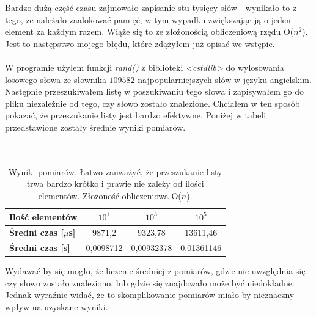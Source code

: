 \documentclass[11pt,a4paper]{article}
\begin{document}
Bardzo dużą część czasu zajmowało zapisanie stu tysięcy słów - wynikało to z tego, że należało zaalokować pamięć, w tym wypadku zwiększając ją o jeden element za każdym razem. Wiąże się to ze złożonością obliczeniową rzędu O($n^2$). Jest to następstwo mojego błędu, które zdążyłem już opisać we wstępie.\\\\
W programie użyłem funkcji \textit{rand()} z biblioteki \textit{<cstdlib>} do wylosowania losowego słowa ze słownika $109582$ najpopularniejszych słów w języku angielskim. Następnie przeszukiwałem listę w poszukiwaniu tego słowa i zapisywałem go do pliku niezależnie od tego, czy słowo zostało znalezione. Chciałem w ten sposób pokazać, że przeszukanie listy jest bardzo efektywne. Poniżej w tabeli przedstawione zostały średnie wyniki pomiarów.\\\\\\

\begin{table}[h]
\begin{center}

\begin{tabular}{|l|c|c|c|}
	\hline
	\textbf{Ilość elementów} & $10^1$ & $10^3$ & $10^5$ \\ \hline
	\textbf{Średni czas [$\mu$s]} & 9871,2 & 9323,78 & 13611,46 \\ \hline
    \textbf{Średni czas [s]} & 0,0098712	& 0,00932378	 & 0,01361146 \\ \hline


\end{tabular}

\end{center}
\caption{Wyniki pomiarów. Łatwo zauważyć, że przeszukanie listy trwa bardzo krótko i prawie nie zależy od ilości elementów. Złożoność obliczeniowa O($n$).}
\end{table}

\bigskip
\bigskip
\bigskip

Wydawać by się mogło, że liczenie średniej z pomiarów, gdzie nie uwzględnia się czy słowo zostało znaleziono, lub gdzie się znajdowało może być niedokładne. Jednak wyraźnie widać, że to skomplikowanie pomiarów miało by nieznaczny wpływ na uzyskane wyniki.
\end{document}
